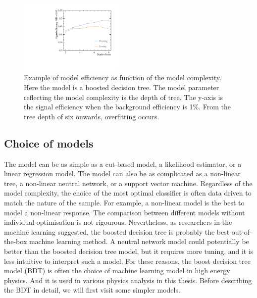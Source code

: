 

\begin{figure}[!tbp]
\includegraphics[width=0.45\textwidth]{doubleHiggs/DepthOfTrees.pdf}
\caption{Example of model efficiency as function of the model complexity. Here the model is a boosted decision tree. The model parameter reflecting the model complexity is the depth of tree. The y-axis is the signal efficiency when the background efficiency is 1\%. From the tree depth of six onwards, overfitting occurs.}
\label{fig:doubleHiggsMVAovertraining}
\end{figure}


\subsection{Choice of models}

The model can be as simple as a cut-based model, a likelihood estimator, or a linear regression model. The model can also be as complicated as a non-linear tree, a non-linear neutral network, or a support vector machine. Regardless of the model complexity, the choice of the most optimal classifier is often data driven to match the nature of the sample. For example, a non-linear model is the best to model a non-linear response. The  comparison between different models without individual optimisation is not rigourous.  Nevertheless, as researchers in the machine learning suggested, the boosted decision tree is probably the best out-of-the-box machine learning method. A neutral network model could potentially be better than the boosted decision tree model, but it requires more tuning, and it is less intuitive to interpret such a model. For these reasons, the boost decision tree model (BDT) is often the choice of machine learning model in high energy physics. And it is used in various physics analysis in this thesis. Before describing the BDT in detail, we will first visit some simpler models.

